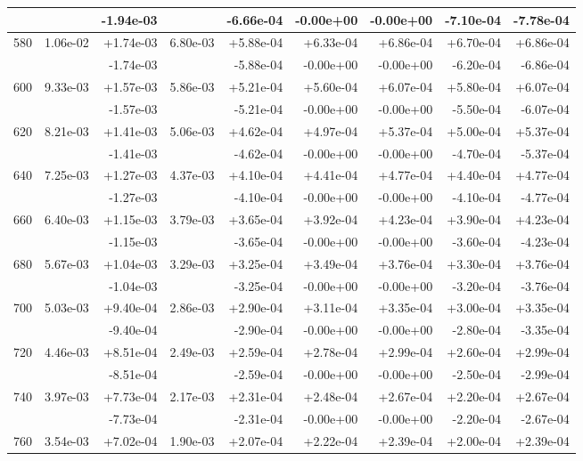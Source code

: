 \begin{tabular}{|c|r|r|r|r|r|r|r|r|}
 & & -1.94e-03  & & -6.66e-04 & -0.00e+00 & -0.00e+00 & -7.10e-04 & -7.78e-04 \\
\hline
580 & 1.06e-02 & +1.74e-03 & 6.80e-03 & +5.88e-04 & +6.33e-04 & +6.86e-04 & +6.70e-04 & +6.86e-04 \\
 & & -1.74e-03  & & -5.88e-04 & -0.00e+00 & -0.00e+00 & -6.20e-04 & -6.86e-04 \\
\hline
600 & 9.33e-03 & +1.57e-03 & 5.86e-03 & +5.21e-04 & +5.60e-04 & +6.07e-04 & +5.80e-04 & +6.07e-04 \\
 & & -1.57e-03  & & -5.21e-04 & -0.00e+00 & -0.00e+00 & -5.50e-04 & -6.07e-04 \\
\hline
620 & 8.21e-03 & +1.41e-03 & 5.06e-03 & +4.62e-04 & +4.97e-04 & +5.37e-04 & +5.00e-04 & +5.37e-04 \\
 & & -1.41e-03  & & -4.62e-04 & -0.00e+00 & -0.00e+00 & -4.70e-04 & -5.37e-04 \\
\hline
640 & 7.25e-03 & +1.27e-03 & 4.37e-03 & +4.10e-04 & +4.41e-04 & +4.77e-04 & +4.40e-04 & +4.77e-04 \\
 & & -1.27e-03  & & -4.10e-04 & -0.00e+00 & -0.00e+00 & -4.10e-04 & -4.77e-04 \\
\hline
660 & 6.40e-03 & +1.15e-03 & 3.79e-03 & +3.65e-04 & +3.92e-04 & +4.23e-04 & +3.90e-04 & +4.23e-04 \\
 & & -1.15e-03  & & -3.65e-04 & -0.00e+00 & -0.00e+00 & -3.60e-04 & -4.23e-04 \\
\hline
680 & 5.67e-03 & +1.04e-03 & 3.29e-03 & +3.25e-04 & +3.49e-04 & +3.76e-04 & +3.30e-04 & +3.76e-04 \\
 & & -1.04e-03  & & -3.25e-04 & -0.00e+00 & -0.00e+00 & -3.20e-04 & -3.76e-04 \\
\hline
700 & 5.03e-03 & +9.40e-04 & 2.86e-03 & +2.90e-04 & +3.11e-04 & +3.35e-04 & +3.00e-04 & +3.35e-04 \\
 & & -9.40e-04  & & -2.90e-04 & -0.00e+00 & -0.00e+00 & -2.80e-04 & -3.35e-04 \\
\hline
720 & 4.46e-03 & +8.51e-04 & 2.49e-03 & +2.59e-04 & +2.78e-04 & +2.99e-04 & +2.60e-04 & +2.99e-04 \\
 & & -8.51e-04  & & -2.59e-04 & -0.00e+00 & -0.00e+00 & -2.50e-04 & -2.99e-04 \\
\hline
740 & 3.97e-03 & +7.73e-04 & 2.17e-03 & +2.31e-04 & +2.48e-04 & +2.67e-04 & +2.20e-04 & +2.67e-04 \\
 & & -7.73e-04  & & -2.31e-04 & -0.00e+00 & -0.00e+00 & -2.20e-04 & -2.67e-04 \\
\hline
760 & 3.54e-03 & +7.02e-04 & 1.90e-03 & +2.07e-04 & +2.22e-04 & +2.39e-04 & +2.00e-04 & +2.39e-04 \\

\end{tabular}

